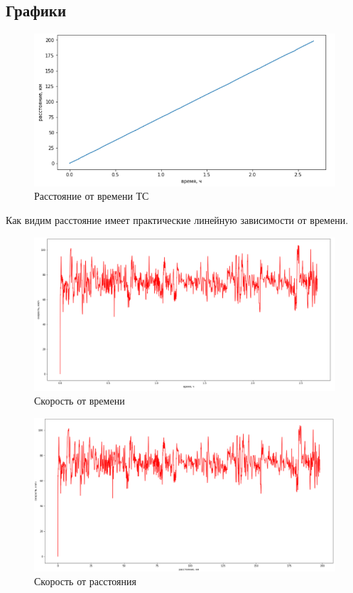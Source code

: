 \documentclass[A4paper,12pt]{article}
\theoremstyle{plain} %
\theoremstyle{definition} %
\theoremstyle{remark} %
\begin{document}
\subsection*{Графики}

\begin{figure}[h!]
    \centering
    \includegraphics[scale = 0.6]{Расстояние_время.png}
    \caption{Расстояние от времени ТС}
\end{figure}

 Как видим расстояние имеет практические линейную зависимости от времени.
 
 \begin{figure}[h!]
     \centering
     \includegraphics[scale =0.55]{скорость_время.png}
     \caption{Скорость от времени}
 \end{figure}
 
 \begin{figure}[h!]
     \centering
     \includegraphics[scale = 0.55]{Скорость_расстояние.png}
     \caption{Скорость от расстояния}
 \end{figure}
 
\end{document}
